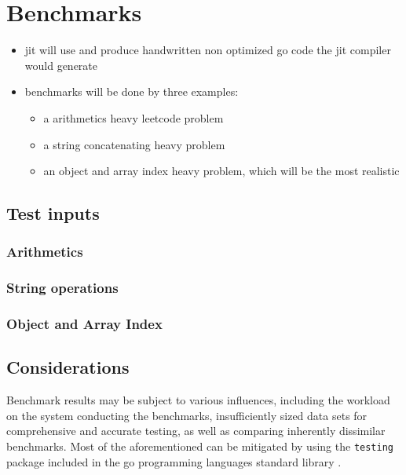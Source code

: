 \chapter{Benchmarks}

\begin{itemize}
    \item jit will use and produce handwritten non optimized go code the jit
        compiler would generate
    \item benchmarks will be done by three examples:
    \begin{itemize}
        \item a arithmetics heavy leetcode problem
        \item a string concatenating heavy problem
        \item an object and array index heavy problem, which will be the most
            realistic
    \end{itemize}
\end{itemize}

\section{Test inputs}

\subsection{Arithmetics}
\subsection{String operations}
\subsection{Object and Array Index}

\section{Considerations}

Benchmark results may be subject to various influences, including the workload
on the system conducting the benchmarks, insufficiently sized data sets for
comprehensive and accurate testing, as well as comparing inherently dissimilar
benchmarks. Most of the aforementioned can be mitigated by using the
\texttt{testing} package included in the go programming languages standard
library \cite{go_testing}. 

